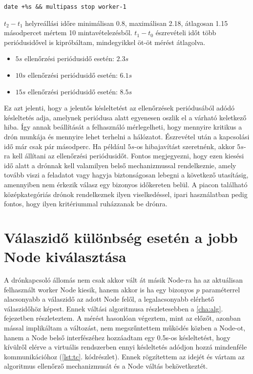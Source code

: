 \begin{lstlisting}[caption={Node kikapcsolása}, label={lst:close}]
date +%s && multipass stop worker-1
\end{lstlisting}

\noindent
$t_2-t_1$ helyreállási időre minimálisan 0.8, maximálisan 2.18, átlagosan 1.15 másodpercet mértem 10 mintavételezésből. $t_1-t_0$ észrevételi időt több periódusidővel is kipróbáltam, mindegyikkel öt-öt mérést átlagolva.
\begin{itemize}
	\item $5s$ ellenőrzési periódusidő esetén: $2.3s$
	\item $10s$ ellenőrzési periódusidő esetén: $6.1s$
	\item $15s$ ellenőrzési periódusidő esetén: $8.5s$
\end{itemize}

\noindent
Ez azt jelenti, hogy a jelentős késleltetést az ellenőrzések periódusából adódó késleltetés adja, amelynek periódusa alatt egyenesen oszlik el a várható keletkező hiba. Így annak beállítását a felhasználó mérlegelheti, hogy mennyire kritikus a drón munkája és mennyire lehet terhelni a hálózatot. Észrevétel után a kapcsolási idő már csak pár másodperc. Ha például $5s$-os hibajavítást szeretnénk, akkor $5s$-ra kell állítani az ellenőrzési periódusidőt. Fontos megjegyezni, hogy ezen kiesési idő alatt a drónnak kell valamilyen belső mechanizmussal rendelkeznie, amely tovább viszi a feladatot vagy hagyja biztonságosan lebegni a következő utasításig, amennyiben nem érkezik válasz egy bizonyos időkereten belül. A piacon található középkategóriás drónok rendelkeznek ilyen viselkedéssel, ipari használatban pedig fontos, hogy ilyen kritériummal ruházzanak be drónra.

\section{Válaszidő különbség esetén a jobb Node kiválasztása}
A drónkapcsoló állomás nem csak akkor vált át másik Node-ra ha az aktuálisan felhasznált worker Node kiesik, hanem akkor is ha egy bizonyos $p$ paraméterrel alacsonyabb a válaszidő az adott Node felől, a legalacsonyabb elérhető válaszidőhöz képest. Ennek váltási algoritmusa részletesebben a \ref{cha:alg}. fejezetben részleteztem. A mérést hasonlóan végeztem, mint az előzőt, azonban mással implikáltam a változást, nem megszűntettem működés közben a Node-ot, hanem a Node belső interfészéhez hozzáadtam egy 0.5s-os késleltetést, hogy kívülről elérve a virtuális rendszerben ennyi késleltetés adódjon hozzá mindenféle kommunikációhoz (\ref{lst:tc}. kódrészlet). Ennek rögzítettem az idejét és vártam az algoritmus ellenőrző mechanizmusát és a Node váltás bekövetkeztét.

